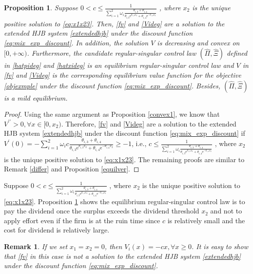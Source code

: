 \documentclass[11pt,reqno]{article}%
\newtheorem{proposition}[theorem]{Proposition}
\newtheorem{remark}[theorem]{Remark}
\numberwithin{equation}{section}
\begin{document}
\begin{proposition}\label{cdeg}
Suppose $0<c\le \frac{1}{\sum\limits_{i=1}^{2}\omega_i\frac{\theta_{i,3}+\theta_{i,4}}{\theta_{i,3} \mathrm{e}^{\theta_{i,3}x_2}+\theta_{i,4}\mathrm{e}^{-\theta_{i,4}x_2}}}$	, where $x_2$ is the unique positive solution to \eqref{eq:x1x23}. Then, \eqref{fv} and \eqref{Videg} are a solution to the extended HJB system \eqref{extendedhjb} under the discount function \eqref{eq:mix_exp_discount}. In addition, the solution $V$ is decreasing and convex on $[0,+\infty)$. Furthermore, the candidate regular-singular control law $\left(\hat\Pi,\hat\Xi\right)$ defined in \eqref{hatpideg} and \eqref{hatxideg} is an equilibrium regular-singular control law and $V$ in \eqref{fv} and \eqref{Videg} is the corresponding equilibrium value function for the objective \eqref{objexmple} under the discount function \eqref{eq:mix_exp_discount}. Besides, $\left(\hat\Pi,\hat\Xi\right)$ is a mild equilibrium.
\end{proposition}
\begin{proof}
Using the same argument as Proposition \ref{convex1}, we know that $V^{\prime\prime}>0, \forall x\in[0,x_2)$. Therefore, \eqref{fv} and \eqref{Videg} are a solution to the extended HJB system \eqref{extendedhjb} under the discount function \eqref{eq:mix_exp_discount} if $V^{\prime}(0)=-\sum\limits_{i=1}^{2}\omega_ic\frac{\theta_{i,3}+\theta_{i,4}}{\theta_{i,3} \mathrm{e}^{\theta_{i,3}x_2}+\theta_{i,4}\mathrm{e}^{-\theta_{i,4}x_2}}\ge -1$, i.e., $c\le \frac{1}{\sum\limits_{i=1}^{2}\omega_i\frac{\theta_{i,3}+\theta_{i,4}}{\theta_{i,3} \mathrm{e}^{\theta_{i,3}x_2}+\theta_{i,4}\mathrm{e}^{-\theta_{i,4}x_2}}}$	, where $x_2$ is the unique positive solution to \eqref{eq:x1x23}. The remaining proofs are similar to Remark \ref{differ} and Proposition \ref{equilver}.
\end{proof}

Suppose $0<c\le \frac{1}{\sum\limits_{i=1}^{2}\omega_i\frac{\theta_{i,3}+\theta_{i,4}}{\theta_{i,3} \mathrm{e}^{\theta_{i,3}x_2}+\theta_{i,4}\mathrm{e}^{-\theta_{i,4}x_2}}}$	, where $x_2$ is the unique positive solution to \eqref{eq:x1x23}. Proposition \ref{cdeg} shows  the equilibrium regular-singular control law is to pay the dividend once the surplus exceeds the dividend threshold $x_2$ and not to apply effort even if the firm is at the ruin time since $c$ is relatively small and the cost for dividend is relatively large.

\begin{remark}
If we set $x_1=x_2=0$, then $V_i(x)=-cx, \forall x\ge0$. It is easy to show that \eqref{fv} in this case is not a solution to the extended HJB system \eqref{extendedhjb} under the discount function \eqref{eq:mix_exp_discount}. 
\end{remark}
\end{document}
